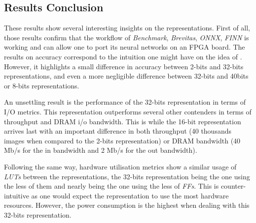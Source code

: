 
\subsection{Results Conclusion}

These results show several interesting insights on the representations. First of all, those results confirm that the workflow of \emph{Benchmark}, \emph{Brevitas}, \emph{ONNX}, \emph{FINN} is working and can allow one to port its neural networks on an FPGA board. The results on accuracy correspond to the intuition one might have on the idea of . However, it highlights a small difference in accuracy between 2-bits and 32-bits representations, and even a more negligible difference between 32-bits and 40bits or 8-bits representations.

An unsettling result is the performance of the 32-bits representation in terms of I/O metrics. This representation outperforms several other contenders in terms of throughput and DRAM i/o bandwidth. This is while the 16-bit representation arrives last with an important difference in both throughput (40 thousands images when compared to the 2-bits representation) or DRAM bandwidth (40 Mb/s for the in bandwidth and 2 Mb/s for the out bandwidth).

Following the same way, hardware utilisation metrics show a similar usage of \emph{LUTs} between the representations, the 32-bits representation being the one using the less of them and nearly being the one using the less of \emph{FFs}. This is counter-intuitive as one would expect the  representation to use the most hardware resources. However, the power consumption is the highest when dealing with this 32-bits representation.
